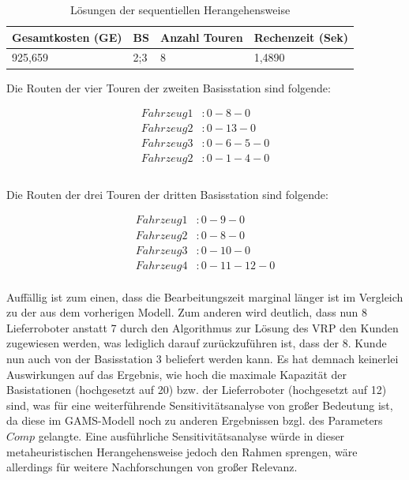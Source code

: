 \documentclass[a4paper,12pt,parskip,bibtotoc,liststotoc]{article}
\begin{document}
\begin{table}[h!]
    \vspace*{-3mm}
    \hspace*{2mm}
  \renewcommand{\arraystretch}{1,5}
  \caption{Lösungen der sequentiellen Herangehensweise
  }
  \begin{center}
 
    \begin{tabular}{|l|l|l|l|} \hline
    \textbf{Gesamtkosten (GE)} &\textbf{BS} &\textbf{Anzahl Touren}&\textbf{ Rechenzeit} (Sek)\\\hline
     925,659 & 2;3 & 8 & 1,4890\\\hline   
	\end{tabular}
	  \end{center}
\end{table}


Die Routen der vier Touren der zweiten Basisstation sind folgende: 

\begin{equation} \label{eq:test}
    \begin{aligned} 
         Fahrzeug 1&: 0 - 8 - 0 \\
        Fahrzeug 2&: 0 - 13 - 0\\
        Fahrzeug 3&: 0 - 6 - 5 - 0\\
        Fahrzeug 2&: 0 - 1 - 4 - 0\\
    \end{aligned}
\end{equation}\\

Die Routen der drei Touren der dritten Basisstation sind folgende: 

\begin{equation} \label{eq:test}
    \begin{aligned} 
         Fahrzeug 1&: 0 - 9 - 0 \\
        Fahrzeug 2&: 0 - 8 - 0\\
         Fahrzeug 3&: 0 - 10 - 0\\
         Fahrzeug 4&: 0 - 11 - 12 - 0\\
    \end{aligned}
\end{equation}


Auffällig ist zum einen, dass die Bearbeitungszeit marginal länger ist im Vergleich zu der aus dem vorherigen Modell. 
Zum anderen wird deutlich, dass nun 8 Lieferroboter anstatt 7 durch den Algorithmus zur Lösung des VRP den Kunden zugewiesen werden, was lediglich darauf zurückzuführen ist, dass der 8. Kunde nun auch von der Basisstation 3 beliefert werden kann.
Es hat demnach keinerlei Auswirkungen auf das Ergebnis, wie hoch die maximale Kapazität der Basistationen (hochgesetzt auf 20) bzw. der Lieferroboter (hochgesetzt auf 12) sind, was für eine weiterführende Sensitivitätsanalyse von großer Bedeutung ist, da diese im GAMS-Modell noch zu anderen Ergebnissen bzgl. des Parameters $Comp$ gelangte.
Eine ausführliche Sensitivitätsanalyse würde in dieser metaheuristischen Herangehensweise jedoch den Rahmen sprengen, wäre allerdings für weitere Nachforschungen von großer Relevanz.\\
\end{document}
